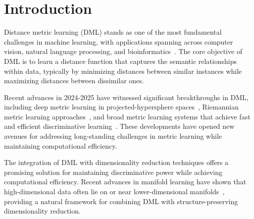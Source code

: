 \documentclass[review]{elsarticle}
\begin{document}
\section{Introduction}

Distance metric learning (DML) stands as one of the most fundamental challenges in machine learning, with applications spanning across computer vision, natural language processing, and bioinformatics~\cite{bellet2013survey}. The core objective of DML is to learn a distance function that captures the semantic relationships within data, typically by minimizing distances between similar instances while maximizing distances between dissimilar ones.

Recent advances in 2024-2025 have witnessed significant breakthroughs in DML, including deep metric learning in projected-hypersphere spaces~\cite{xu2025deep}, Riemannian metric learning approaches~\cite{gruffaz2025riemannian}, and broad metric learning systems that achieve fast and efficient discriminative learning~\cite{hu2025broad}. These developments have opened new avenues for addressing long-standing challenges in metric learning while maintaining computational efficiency.

The integration of DML with dimensionality reduction techniques offers a promising solution for maintaining discriminative power while achieving computational efficiency. Recent advances in manifold learning have shown that high-dimensional data often lie on or near lower-dimensional manifolds~\cite{roweis2000nonlinear,tenenbaum2000global}, providing a natural framework for combining DML with structure-preserving dimensionality reduction.
\end{document}
